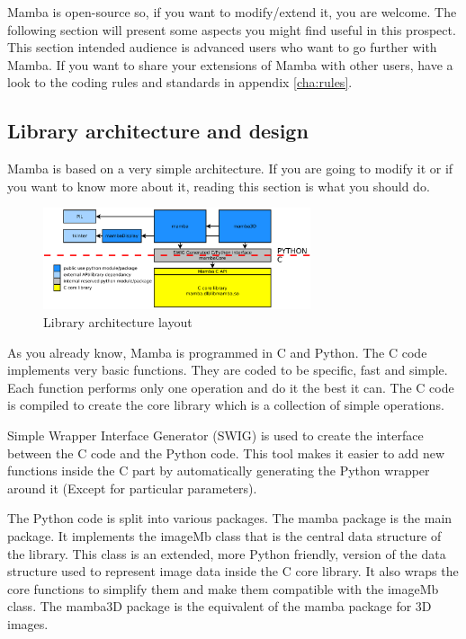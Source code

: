 \documentclass[a4paper,10pt,oneside]{article}
\begin{document}
Mamba is open-source so, if you want to modify/extend it, you are welcome. The
following section will present some aspects you might find useful in this
prospect. This section intended audience is advanced users who want to go 
further with Mamba. If you want to share your extensions of Mamba with other users,
have a look to the coding rules and standards in appendix \ref{cha:rules}. 

\subsection{Library architecture and design}
\label{cha:lib_arch}

Mamba is based on a very simple architecture. If you are going to modify it or
if you want to know more about it, reading this section is what you should do.

\begin{figure}
\centering
\includegraphics[width=0.7\textwidth]{figures/archi.pdf}
\caption{Library architecture layout}
\label{fig:archi_lay}
\end{figure}

As you already know, Mamba is programmed in C and Python. The C code implements
very basic functions. They are coded to be specific, fast and simple. Each 
function performs only one operation and do it the best it can. The C code is 
compiled to create the core library which is a collection of simple operations.

Simple Wrapper Interface Generator (SWIG) is used to create the interface 
between the C code and the Python code. This tool makes it easier to add new
functions inside the C part by automatically generating the Python wrapper
around it (Except for particular parameters).

The Python code is split into various packages. The mamba package is the 
main package. It implements the imageMb class that is the
central data structure of the library. This class is an extended, more Python
friendly, version of the data structure used to represent image data inside the
C core library. It also wraps the core functions to simplify them
and make them compatible with the imageMb class. The mamba3D package is the
equivalent of the mamba package for 3D images.
\end{document}

